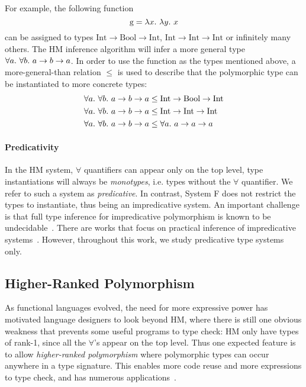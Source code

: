 For example, the following function
$$\text{g} = \lam[x]{\lam[y] x}$$
can be assigned to types $\text{Int} \to \text{Bool} \to \text{Int}$,
$\text{Int} \to \text{Int} \to \text{Int}$ or infinitely many others.
The HM inference algorithm will infer a more general type $\all[a]{\all[b] a \to b \to a}$.
In order to use the function as the types mentioned above,
a more-general-than relation $\le$ is used to describe that
the polymorphic type can be instantiated to more concrete types:
$$\begin{aligned}
  \all[a]{\all[b] a \to b \to a} &\le \text{Int} \to \text{Bool} \to \text{Int}\\
  \all[a]{\all[b] a \to b \to a} &\le \text{Int} \to \text{Int} \to \text{Int}\\
  \all[a]{\all[b] a \to b \to a} &\le \all a \to a \to a\\
\end{aligned}$$

\paragraph{Predicativity}
In the HM system, $\forall$ quantifiers can appear only on the top level,
type instantiations will always be \emph{monotypes},
i.e. types without the $\forall$ quantifier.
We refer to such a system as \emph{predicative}.
In contrast, System F does not restrict the types to instantiate,
thus being an impredicative system.
An important challenge is that full type inference for impredicative
polymorphism is known to be undecidable~\citep{wells1999typability}.
There are works that focus on practical inference of
impredicative systems~\citep{le2003ml,leijen2008hmf,
vytiniotis2008fph,Serrano2018,quicklook2020,FreezeML}.
However, throughout this work, we study predicative type systems only.

\subsection{Higher-Ranked Polymorphism}
As functional languages evolved, the need for more expressive
power has motivated language designers to look beyond HM,
where there is still one obvious weakness that prevents some useful programs to type check:
HM only have types of rank-1, since all the $\forall$'s appear on the top level.
Thus one expected feature is to allow 
\emph{higher-ranked polymorphism} where polymorphic types can
occur anywhere in a type signature.
This enables more code reuse and more expressions to type check, and has
numerous applications~\citep{jones1995functional,gill1993short,launchbury1995state,lammel2003scrap}.

